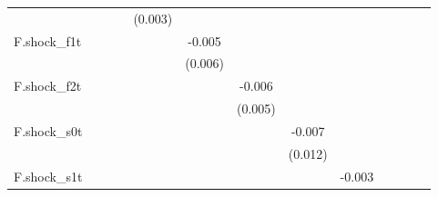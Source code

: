 {\begin{tabular}{l*{12}{c}}
            &                     &                     &                     &     (0.003)         &                     &                     &                     &                     &                     &                     &                     &                     \\
\addlinespace
F.shock\_f1t &                     &                     &                     &                     &      -0.005         &                     &                     &                     &                     &                     &                     &                     \\
            &                     &                     &                     &                     &     (0.006)         &                     &                     &                     &                     &                     &                     &                     \\
\addlinespace
F.shock\_f2t &                     &                     &                     &                     &                     &      -0.006         &                     &                     &                     &                     &                     &                     \\
            &                     &                     &                     &                     &                     &     (0.005)         &                     &                     &                     &                     &                     &                     \\
\addlinespace
F.shock\_s0t &                     &                     &                     &                     &                     &                     &      -0.007         &                     &                     &                     &                     &                     \\
            &                     &                     &                     &                     &                     &                     &     (0.012)         &                     &                     &                     &                     &                     \\
\addlinespace
F.shock\_s1t &                     &                     &                     &                     &                     &                     &                     &      -0.003         &                     &                     &                     &                     \\

\end{tabular}}
